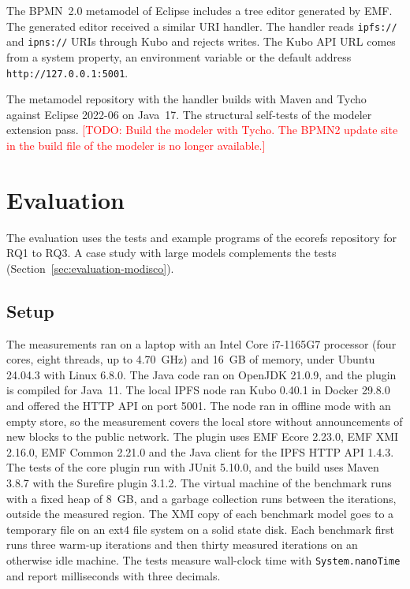 \documentclass[iicol,pdflatex,sn-mathphys-num]{sn-jnl}
\theoremstyle{thmstylethree}%
\newcommand{\todo}[1]{\textcolor{red}{[TODO: #1]}}
\begin{document}
The BPMN~2.0 metamodel of Eclipse includes a tree editor generated by EMF. The generated editor received a similar URI handler. The handler reads \texttt{ipfs://} and \texttt{ipns://} URIs through Kubo and rejects writes. The Kubo API URL comes from a system property, an environment variable or the default address \texttt{http://127.0.0.1:5001}.

The metamodel repository with the handler builds with Maven and Tycho against Eclipse 2022-06 on Java~17. The structural self-tests of the modeler extension pass. \todo{Build the modeler with Tycho. The BPMN2 update site in the build file of the modeler is no longer available.}

\section{Evaluation}\label{sec:evaluation}

The evaluation uses the tests and example programs of the ecorefs repository for RQ1 to RQ3. A case study with large models complements the tests (Section~\ref{sec:evaluation-modisco}).

\subsection{Setup}\label{sec:evaluation-setup}

The measurements ran on a laptop with an Intel Core i7-1165G7 processor (four cores, eight threads, up to 4.70~GHz) and 16~GB of memory, under Ubuntu 24.04.3 with Linux 6.8.0. The Java code ran on OpenJDK 21.0.9, and the plugin is compiled for Java~11. The local IPFS node ran Kubo 0.40.1 in Docker 29.8.0 and offered the HTTP API on port 5001. The node ran in offline mode with an empty store, so the measurement covers the local store without announcements of new blocks to the public network. The plugin uses EMF Ecore 2.23.0, EMF XMI 2.16.0, EMF Common 2.21.0 and the Java client for the IPFS HTTP API 1.4.3. The tests of the core plugin run with JUnit 5.10.0, and the build uses Maven 3.8.7 with the Surefire plugin 3.1.2. The virtual machine of the benchmark runs with a fixed heap of 8~GB, and a garbage collection runs between the iterations, outside the measured region. The XMI copy of each benchmark model goes to a temporary file on an ext4 file system on a solid state disk. Each benchmark first runs three warm-up iterations and then thirty measured iterations on an otherwise idle machine. The tests measure wall-clock time with \texttt{System.nanoTime} and report milliseconds with three decimals.
\end{document}
